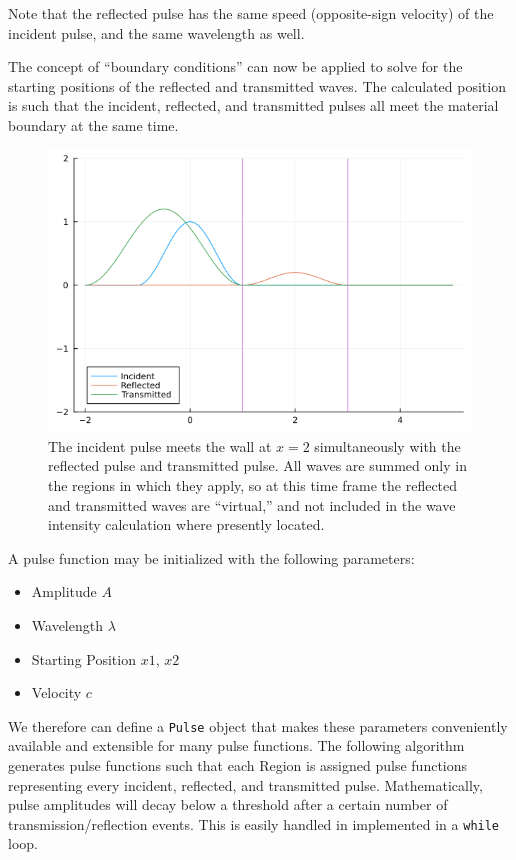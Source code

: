 \documentclass[twocolumn, letterpaper]{article}
\begin{document}
Note that the reflected pulse has the same speed (opposite-sign velocity) of the incident pulse, and the same wavelength as well.

The concept of ``boundary conditions'' can now be applied to solve for the starting positions of the reflected and transmitted waves. The calculated position is such that the incident, reflected, and transmitted pulses all meet the material boundary at the same time.

\begin{figure}
\includegraphics[width=\columnwidth]{Thing6}
\caption{The incident pulse meets the wall at $x=2$ simultaneously with the reflected pulse and transmitted  pulse. All waves are summed only in the regions in which they apply, so at this time frame the reflected and transmitted waves are ``virtual,'' and not included in the wave intensity calculation where presently located. }
\label{fig:pulse-timing}
\end{figure}

A pulse function may be initialized with the following parameters:

\begin{itemize}
\item Amplitude $A$
\item Wavelength $\lambda$
\item Starting Position $x1$, $x2$
\item Velocity $c$
\end{itemize}

We therefore can define a \texttt{Pulse} object that makes these parameters conveniently available and extensible for many pulse functions. The following algorithm generates pulse functions such that each Region is assigned pulse functions representing every incident, reflected, and transmitted pulse. Mathematically, pulse amplitudes will decay below a threshold after a certain number of transmission/reflection events. This is easily handled in implemented in a \texttt{while} loop.
\end{document}
